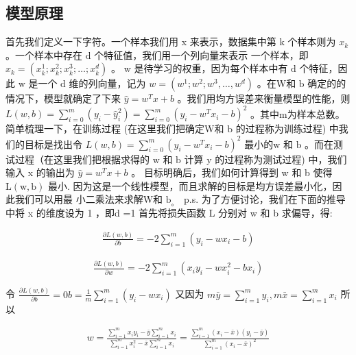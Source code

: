 \documentclass[withoutpreface,bwprint]{cumcmthesis} %
\begin{document}
\subsection{模型原理}
首先我们定义一下字符。一个样本我们用  x  来表示，数据集中第 $ \mathrm{k}$   个样本则为 $  x_{k}$   。一个样本中存在 $  \mathrm{d}$   个特征值，我们用一个列向量来表示 一个样本，即  $ x_{k}=\left(x_{k}^{1} ; x_{k}^{2} ; x_{k}^{3} ; \ldots ; x_{k}^{d}\right) $  。  w  是待学习的权重，因为每个样本中有 $  \mathrm{d} $  个特征，因此  $ \mathrm{w}$   是一个  $ \mathrm{d}$   维的列向量，记为  $ w=\left(w^{1} ; w^{2} ; w^{3}, \ldots, w^{d}\right) $  。在W和  $ \mathrm{b}$   确定的的情况下，模型就确定了下来  $ \hat{y}=w^{T} x+b$   。我们用均方误差来衡量模型的性能，则  $L(w,b)=\sum_{i=0}^{m}\left(y_{i}-\hat{y}_{i}^{2}\right)=\sum_{i=0}^{m}\left(y_{i}-w^{T} x_{i}-b\right)^{2} $  。其中m为样本总数。
简单梳理一下，在训练过程 (在这里我们把确定W和 $  \mathrm{b}$   的过程称为训练过程) 中我们的目标是找出令  $ L(w, b)=\sum_{i=0}^{m}\left(y_{i}-w^{T} x_{i}-b\right)^{2}$   最小的$   \mathrm{w} $  和  $ \mathrm{b} $  。而在测试过程（在这里我们把根据求得的 $  \mathrm{w}$   和  $ \mathrm{b}$   计算 $  \mathrm{y} $  的过程称为测试过程) 中，我们输入  x  的输出为  $ \hat{y}=w^{T} x+b $  。
目标明确后，我们如何计算得到  w  和  b  使得 $  \mathrm{L}(\mathrm{w}, \mathrm{b})$   最小. 因为这是一个线性模型，而且求解的目标是均方误差最小化，因此我们可以用最 小二乘法来求解W和  $ \mathrm{b}_{\text {。 }} $ 
p.s. 为了方便讨论，我们在下面的推导中将  x  的维度设为 1 ，即d  =1  首先将损失函数  L  分别对  w  和  b  求偏导，得:


\begin{align}
\frac{\partial L(w, b)}{\partial b}=-2 \sum_{i=1}^{m}\left(y_{i}-w x_{i}-b\right)
\end{align}


\begin{align}
\frac{\partial L(w, b)}{\partial w}=-2 \sum_{i=1}^{m}\left(x_{i} y_{i}-w x_{i}^{2}-b x_{i}\right)
\end{align}



令 $ \frac{\partial L(w, b)}{\partial b}=0    b=\frac{1}{m} \sum_{i=1}^{m}\left(y_{i}-w x_{i}\right) $ 又因为 $ m \bar{y}=\sum_{i=1}^{m} y_{i}, m \bar{x}=\sum_{i=1}^{m} x_{i} $ 所以

\begin{align}
w=\frac{\sum_{i=1}^{m} x_{i} y_{i}-\bar{y} \sum_{i=1}^{m} x_{i}}{\sum_{i=1}^{m} x_{i}^{2}-\bar{x} \sum_{i=1}^{m} x_{i}}=\frac{\sum_{i=1}^{m}\left(x_{i}-\bar{x}\right)\left(y_{i}-\bar{y}\right)}{\sum_{i=1}^{m}\left(x_{i}-\bar{x}\right)^{2}}
\end{align}
\end{document}
